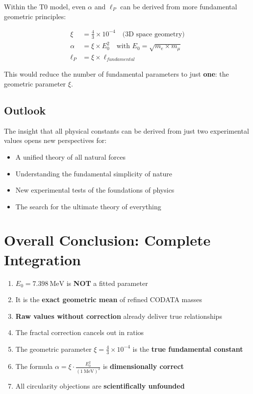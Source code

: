 \documentclass[12pt,a4paper]{article}
\theoremstyle{definition}
\begin{document}
	Within the T0 model, even $\alpha$ and $\ell_P$ can be derived from more fundamental geometric principles:
	
	\begin{align}
		\xi &= \frac{4}{3} \times 10^{-4} \quad \text{(3D space geometry)}\\
		\alpha &= \xi \times E_0^2 \quad \text{with } E_0 = \sqrt{m_e \times m_\mu}\\
		\ell_P &= \xi \times \ell_{fundamental}
	\end{align}
	
	This would reduce the number of fundamental parameters to just \textbf{one}: the geometric parameter $\xi$.
	
	\subsection{Outlook}
	
	The insight that all physical constants can be derived from just two experimental values opens new perspectives for:
	
	\begin{itemize}
		\item A unified theory of all natural forces
		\item Understanding the fundamental simplicity of nature
		\item New experimental tests of the foundations of physics
		\item The search for the ultimate theory of everything
	\end{itemize}
	
	\section{Overall Conclusion: Complete Integration}
	
	\begin{tcolorbox}[colback=red!5!white,colframe=red!75!black,title=Complete Summary]
		\begin{enumerate}
			\item $E_0 = \SI{7.398}{\MeV}$ is \textbf{NOT} a fitted parameter
			\item It is the \textbf{exact geometric mean} of refined CODATA masses
			\item \textbf{Raw values without correction} already deliver true relationships
			\item The fractal correction cancels out in ratios
			\item The geometric parameter $\xi = \frac{4}{3} \times 10^{-4}$ is the \textbf{true fundamental constant}
			\item The formula $\alpha = \xi \cdot \frac{E_0^2}{( \SI{1}{\MeV} )^2}$ is \textbf{dimensionally correct}
			\item All circularity objections are \textbf{scientifically unfounded}
		\end{enumerate}
	\end{tcolorbox}
	
\end{document}
